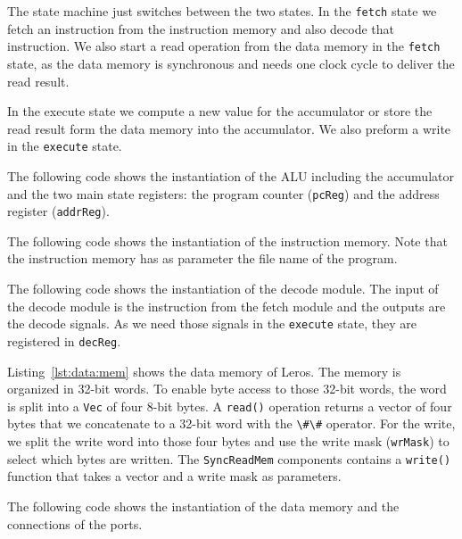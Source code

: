 \documentclass[%
    10pt,
    headinclude, footexclude,
    openright, %
    notitlepage,
    cleardoubleempty,
    headsepline,
    pointlessnumbers,
    bibtotoc, idxtotoc,
    ]{scrbook}
\newcommand{\code}[1]{{\lstinline[basicstyle=\small\ttfamily]{#1}}}
\begin{document}



\noindent The state machine just switches between the two states.
In the \code{fetch} state we fetch an instruction from the instruction
memory and also decode that instruction. We also start a read operation
from the data memory in the \code{fetch} state, as the data memory
is synchronous and needs one clock cycle to deliver the read result.

In the execute state we compute a new value for the accumulator
or store the read result form the data memory into the accumulator.
We also preform a write in the \code{execute} state.

The following code shows the instantiation of the ALU including the
accumulator and the two main state registers: the program counter (\code{pcReg})
and the address register (\code{addrReg}).


The following code shows the instantiation of the instruction memory.
Note that the instruction memory has as parameter the file name
of the program.


The following code shows the instantiation of the decode module.
The input of the decode module is the instruction from the fetch
module and the outputs are the decode signals. As we need those signals
in the \code{execute} state, they are registered in \code{decReg}.




Listing~\ref{lst:data:mem} shows the data memory of Leros.
The memory is organized in 32-bit words. To enable byte access to those
32-bit words, the word is split into a \code{Vec} of four 8-bit bytes.
A \code{read()} operation returns a vector of four bytes that we
concatenate to a 32-bit word with the \code{\#\#} operator.
For the write, we split the write word into those four bytes and
use the write mask (\code{wrMask}) to select which bytes are written.
The \code{SyncReadMem} components contains a \code{write()} function
that takes a vector and a write mask as parameters.


The following code shows the instantiation of the data memory and the connections
of the ports. 

\end{document}
